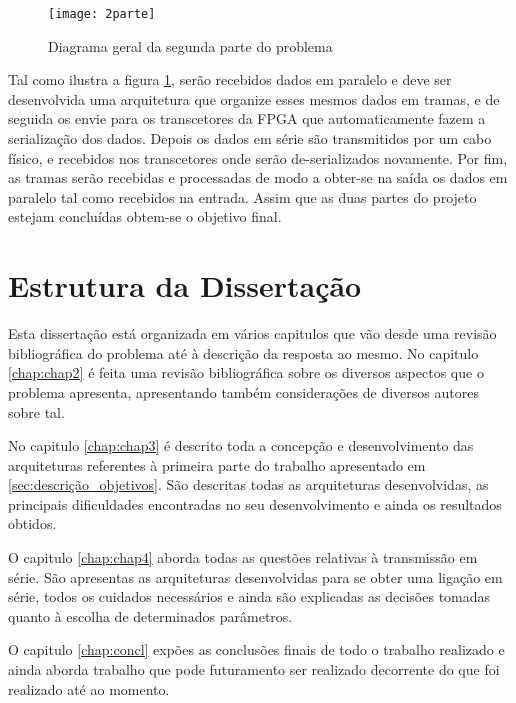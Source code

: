 \begin{figure}[h!]
	\begin{center}
		\leavevmode
		\texttt{[image: 2parte]}
		\caption{Diagrama geral da segunda parte do problema}
		\label{fig:2parte_projeto}
	\end{center}
\end{figure}

Tal como ilustra a figura \ref{fig:2parte_projeto}, serão recebidos dados em paralelo e deve ser desenvolvida uma arquitetura que organize esses mesmos dados em tramas, e de seguida os envie para os transcetores da FPGA que automaticamente fazem a serialização dos dados. Depois os dados em série são transmitidos por um cabo físico, e recebidos nos transcetores onde serão de-serializados novamente. Por fim, as tramas serão recebidas e processadas de modo a obter-se na saída os dados em paralelo tal como recebidos na entrada. Assim que as duas partes do projeto estejam concluídas obtem-se o objetivo final.

\section{Estrutura da Dissertação} \label{sec:struct}

Esta dissertação está organizada em vários capitulos que vão desde uma revisão bibliográfica do problema até à descrição da resposta ao mesmo. 
No capitulo \ref{chap:chap2} é feita uma revisão bibliográfica sobre os diversos aspectos que o problema apresenta, apresentando também considerações de diversos autores sobre tal.  

No capitulo \ref{chap:chap3} é descrito toda a concepção e desenvolvimento das arquiteturas referentes à primeira parte do trabalho apresentado em \ref{sec:descrição_objetivos}. São descritas todas as arquiteturas desenvolvidas, as principais dificuldades encontradas no seu desenvolvimento e ainda os resultados obtidos.

O capitulo \ref{chap:chap4} aborda todas as questões relativas à transmissão em série. São apresentas as arquiteturas desenvolvidas para se obter uma ligação em série, todos os cuidados necessários e ainda são explicadas as decisões tomadas quanto à escolha de determinados parâmetros.

O capitulo \ref{chap:concl} expões as conclusões finais de todo o trabalho realizado e ainda aborda trabalho que pode futuramento ser realizado decorrente do que foi realizado até ao momento.

